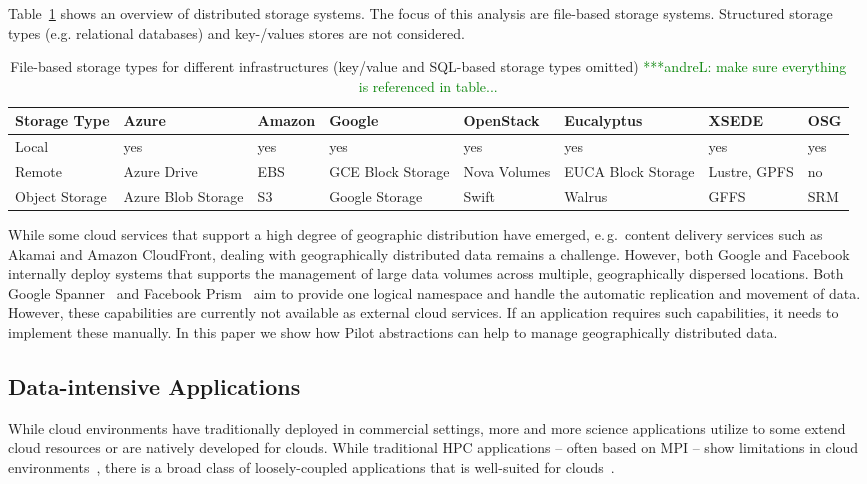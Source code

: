 \documentclass[times]{cpeauth}
\newcommand{\alnote}[1]{ {\textcolor{green} { ***andreL: #1 }}}
\newcommand{\alnote}[1]{}
\newcommand{\pilot}{Pilot\xspace}
\begin{document}
Table~\ref{tab:storage-systems} shows an overview of distributed
storage systems. The focus of this analysis are file-based storage
systems. Structured storage types (e.g. relational databases) and
key-/values stores are not considered.

\begin{table}[t]
\centering
\begin{tabular}{|p{1.7cm}|p{1.3cm}|p{1.3cm}|p{1.3cm}|p{1.4cm}|p{1.4cm}|p{1.3cm}|p{1.2cm}|}
	\hline
	\textbf{Storage Type} &\textbf{Azure} &\textbf{Amazon} &\textbf{Google} &\textbf{Open\-Stack} &\textbf{Euca\-lyptus} &\textbf{XSEDE}  &\textbf{OSG} \\
	\hline
	Local	&yes &yes &yes &yes &yes &yes &yes\\
	\hline
	Remote &Azure Drive &EBS &GCE Block Storage &Nova Volumes &EUCA Block Storage &Lustre, GPFS 
	&no\\
	\hline
	Object Storage &Azure Blob Storage &S3 &Google Storage &Swift & Walrus &GFFS
	 &SRM\\
	\hline	
\end{tabular}
\caption{File-based storage types for different infrastructures (key/value and 
SQL-based storage types omitted)\alnote{make sure everything is referenced in table...}  \label{tab:storage-systems}}
\end{table}


While some cloud services that support a high degree of geographic
distribution have emerged, e.\,g.\ content delivery services such as
Akamai and Amazon CloudFront, dealing with geographically distributed
data remains a challenge. However, both Google and Facebook internally
deploy systems that supports the management of large data volumes
across multiple, geographically dispersed locations. Both Google
Spanner~\cite{dean09} and Facebook Prism~\cite{Metz12} aim to provide
one logical namespace and handle the automatic replication and
movement of data. However, these capabilities are currently not
available as external cloud services. If an application requires such
capabilities, it needs to implement these manually. In this paper we
show how \pilot abstractions can help to manage geographically
distributed data.


\subsection{Data-intensive Applications}

While cloud environments have traditionally deployed in commercial settings,
more and more science applications utilize to some extend cloud resources or
are natively developed for clouds. While traditional HPC applications -- often
based on MPI -- show limitations in cloud
environments~\cite{Evangelinos2008,Mehrotra:2012:PEA:2287036.2287045}, there
is a broad class of loosely-coupled applications that is well-suited for
clouds~\cite{1851544,Sehgal2011590}.
\end{document}
